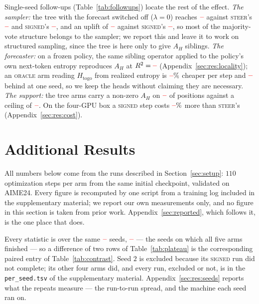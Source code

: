 \documentclass[11pt]{article}
\newcommand{\Htogo}{H_{\mathrm{togo}}}
\newcommand{\AH}{A_{H}}
\providecommand{\PENDING}{\textcolor{red}{\textbf{--}}}
\newcommand{\num}[1]{\ifcsname #1\endcsname\csname #1\endcsname\else\PENDING\fi}
\begin{document}
Single-seed follow-ups (Table~\ref{tab:followups}) locate the rest of the effect.
\emph{The sampler:} the tree with the forecast switched off ($\lambda = 0$) reaches
$\num{Rlamzeroacc}$ against \textsc{steer}'s $\num{Rsteeracc}$ and \textsc{signed}'s
$\num{Rsignedacc}$, and an uplift of $\num{Rlamzerouplift}$ against \textsc{signed}'s
$\num{Rsigneduplift}$, so most of the majority-vote structure belongs to the sampler;
we report this and leave it to work on structured sampling, since the tree is here
only to give $\AH$ siblings. \emph{The forecaster:} on a frozen policy, the same
sibling operator applied to the policy's own next-token entropy reproduces $\AH$ at
$R^2 = \num{Locrsq}$ (Appendix~\ref{sec:res:locality}); an \textsc{oracle} arm reading
$\Htogo$ from realized entropy is $\num{Fsignedoraclesaving}\%$ cheaper per step and
$\num{Fsignedoracleacc}$ behind at one seed, so we keep the heads without claiming they
are necessary. \emph{The support:} the tree arms carry a non-zero $\AH$ on
$\num{Rsignedbranchfrac}$ of positions against a ceiling of $\num{Supportbound}$. On
the four-GPU box a \textsc{signed} step costs $\num{Costoverheadhi}\%$ more than
\textsc{steer}'s (Appendix~\ref{sec:res:cost}).

\section{Additional Results}
\label{sec:results-app}
All numbers below come from the runs described in Section~\ref{sec:setup}:
$110$ optimization steps per arm from the same initial checkpoint, validated on
AIME24. Every figure is recomputed by one script from a training log included in the
supplementary material; we report our own measurements only, and no figure in this section is
taken from prior work. Appendix~\ref{sec:reported}, which follows it, is the one place
that does.

Every statistic is over the same $\num{Nseedsused}$ seeds, $\num{Seedset}$ --- the
seeds on which all five arms finished --- so a difference of two rows of
Table~\ref{tab:plateau} is the corresponding paired entry of
Table~\ref{tab:contrast}. Seed $2$ is excluded because its \textsc{signed} run did not
complete; its other four arms did, and every run, excluded or not, is in the
\texttt{per\_seed.tsv} of the supplementary material. Appendix~\ref{sec:res:seeds} reports what the
repeats measure --- the run-to-run spread, and the machine each seed ran on.
\end{document}
